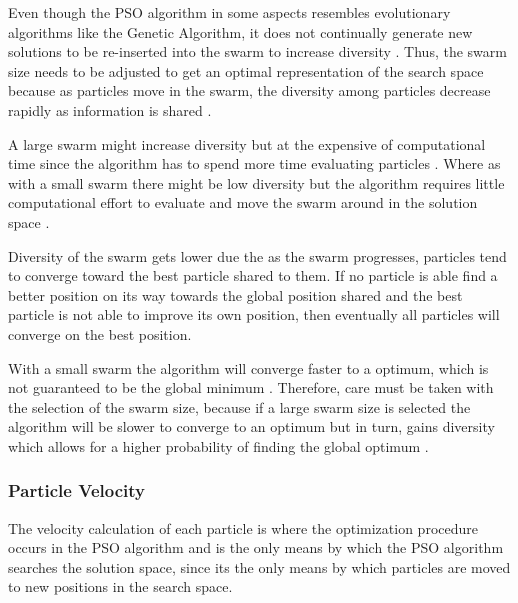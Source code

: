 Even though the PSO algorithm in some aspects resembles evolutionary algorithms like the Genetic Algorithm, it does not continually generate new solutions to be re-inserted into the swarm to increase diversity \cite{PSOHybridUnitCommit}. Thus, the swarm size needs to be adjusted to get an optimal representation of the search space because as particles move in the swarm, the diversity among particles decrease rapidly as information is shared \cite{FundamentalSwarm,CompuIntelligenceIntro}. 

A large swarm might increase diversity but at the expensive of computational time since the algorithm has to spend more time evaluating particles \cite{FundamentalSwarm,CompuIntelligenceIntro}. Where as with a small swarm there might be low diversity but the algorithm requires little computational effort to evaluate and move the swarm around in the solution space \cite{FundamentalSwarm,CompuIntelligenceIntro}.

Diversity of the swarm gets lower due the as the swarm progresses, particles tend to converge toward the best particle shared to them. If no particle is able find a better position on its way towards the global position shared and the best particle is not able to improve its own position, then eventually all particles will converge on the best position.

With a small swarm the algorithm will converge faster to a optimum, which is not guaranteed to be the global minimum \cite{FundamentalSwarm,CompuIntelligenceIntro}. Therefore, care must be taken with the selection of the swarm size, because if a large swarm size is selected the algorithm will be slower to converge to an optimum but in turn, gains diversity which allows for a higher probability of finding the global optimum \cite{PSOPESO}.
\subsubsection{Particle Velocity}
\label{sec:particleVelocity}
The velocity calculation of each particle is where the optimization procedure occurs in the PSO algorithm and is the only means by which the PSO algorithm searches the solution space, since its the only means by which particles are moved to new positions in the search space\cite{CompuIntelligenceIntro}.

